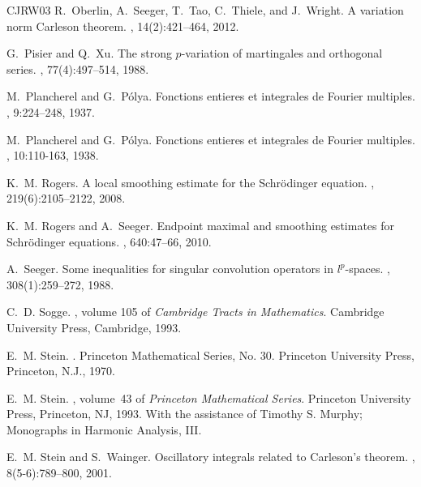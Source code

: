 \documentclass[12pt,leqno]{amsart}
\theoremstyle{plain}
\numberwithin{equation}{section}
\begin{document}
\begin{thebibliography}{CJRW03}
	R.~Oberlin, A.~Seeger, T.~Tao, C.~Thiele, and J.~Wright.
	\newblock A variation norm {C}arleson theorem.
	, 14(2):421--464, 2012.
	
	G.~Pisier and Q.~Xu.
	\newblock The strong $p$-variation of martingales and orthogonal series.
	, 77(4):497--514, 1988.
	
	M.~Plancherel and G.~P\'{o}lya.
	\newblock Fonctions entieres et integrales de Fourier multiples.
	, 9:224--248, 1937.

	M.~Plancherel and G.~P\'{o}lya.
	\newblock Fonctions entieres et integrales de Fourier multiples.
	, 10:110-163, 1938.

	K.~M. Rogers.
	\newblock A local smoothing estimate for the Schr\"{o}dinger equation. 
	, 219(6):2105--2122, 2008.

	K.~M. Rogers and A.~Seeger.
	\newblock Endpoint maximal and smoothing estimates for {S}chr\"odinger
	equations.
	, 640:47--66, 2010.
	
	A.~Seeger.
	\newblock Some inequalities for singular convolution operators in $l^p$-spaces.
	, 308(1):259--272, 1988.
	
	C.~D. Sogge.
	, volume 105 of {\em
		Cambridge Tracts in Mathematics}.
	\newblock Cambridge University Press, Cambridge, 1993.
	
	E.~M. Stein.
	.
	\newblock Princeton Mathematical Series, No. 30. Princeton University Press,
	Princeton, N.J., 1970.
	
	E.~M. Stein.
	, volume~43 of {\em Princeton Mathematical Series}.
	\newblock Princeton University Press, Princeton, NJ, 1993.
	\newblock With the assistance of Timothy S. Murphy; Monographs in Harmonic
	Analysis, III.
	
	E.~M. Stein and S.~Wainger.
	\newblock Oscillatory integrals related to {C}arleson's theorem.
	, 8(5-6):789--800, 2001.
	

\end{thebibliography}
\end{document}
